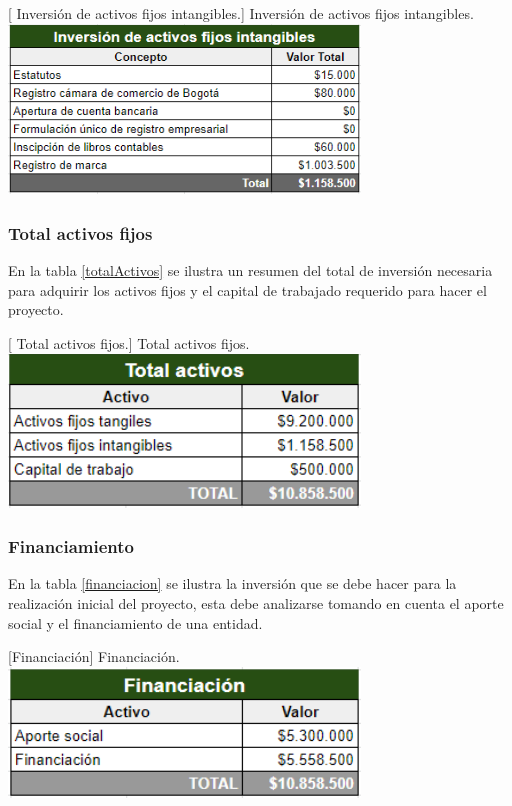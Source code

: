 \vspace{2mm}
\begin{minipage}{0.9\textwidth}
\centering
{}[{ Inversión de activos fijos intangibles.}]{ Inversión de activos fijos intangibles. }
\label{activosIntangibles}
\includegraphics[width=0.7\textwidth]{Images/fijosIntangibles.png}
\end{minipage}

\subsubsection{Total activos fijos}
En la tabla \ref{totalActivos} se ilustra un resumen del total de inversión necesaria para adquirir los activos fijos y el capital de trabajado requerido para hacer el proyecto.

\vspace{2mm}
\begin{minipage}{0.9\textwidth}
\centering
{}[{ Total activos fijos.}]{ Total activos fijos. }
\label{totalActivos}
\includegraphics[width=0.7\textwidth]{Images/totalActivos.png}
\end{minipage}

\subsubsection{Financiamiento}
En la tabla \ref{financiacion} se ilustra la inversión que se debe hacer para la realización inicial del proyecto, esta debe analizarse tomando en cuenta el aporte social y el financiamiento de una entidad.

\vspace{2mm}
\begin{minipage}{0.9\textwidth}
\centering
{}[{Financiación}]{ Financiación. }
\label{financiacion}
\includegraphics[width=0.7\textwidth]{Images/financiacion.png}
\end{minipage}